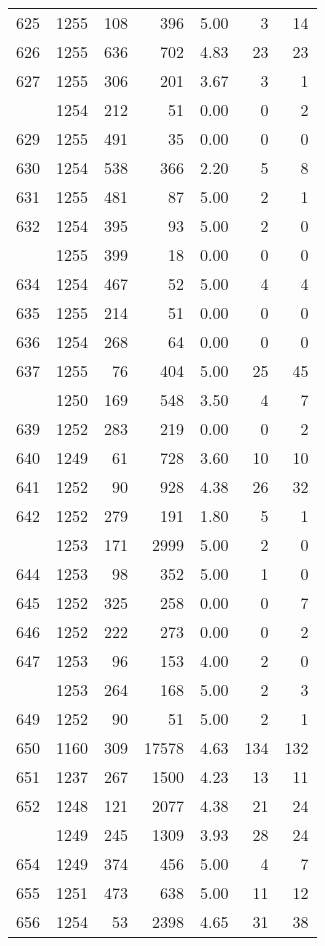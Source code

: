\documentclass[
]{article}
\begin{document}
\begin{table}
\begin{tabular}[t]{lrrrrrr}
625 & 1255 & 108 & 396 & 5.00 & 3 & 14\\
626 & 1255 & 636 & 702 & 4.83 & 23 & 23\\
627 & 1255 & 306 & 201 & 3.67 & 3 & 1\\
\addlinespace
628 & 1254 & 212 & 51 & 0.00 & 0 & 2\\
629 & 1255 & 491 & 35 & 0.00 & 0 & 0\\
630 & 1254 & 538 & 366 & 2.20 & 5 & 8\\
631 & 1255 & 481 & 87 & 5.00 & 2 & 1\\
632 & 1254 & 395 & 93 & 5.00 & 2 & 0\\
\addlinespace
633 & 1255 & 399 & 18 & 0.00 & 0 & 0\\
634 & 1254 & 467 & 52 & 5.00 & 4 & 4\\
635 & 1255 & 214 & 51 & 0.00 & 0 & 0\\
636 & 1254 & 268 & 64 & 0.00 & 0 & 0\\
637 & 1255 & 76 & 404 & 5.00 & 25 & 45\\
\addlinespace
638 & 1250 & 169 & 548 & 3.50 & 4 & 7\\
639 & 1252 & 283 & 219 & 0.00 & 0 & 2\\
640 & 1249 & 61 & 728 & 3.60 & 10 & 10\\
641 & 1252 & 90 & 928 & 4.38 & 26 & 32\\
642 & 1252 & 279 & 191 & 1.80 & 5 & 1\\
\addlinespace
643 & 1253 & 171 & 2999 & 5.00 & 2 & 0\\
644 & 1253 & 98 & 352 & 5.00 & 1 & 0\\
645 & 1252 & 325 & 258 & 0.00 & 0 & 7\\
646 & 1252 & 222 & 273 & 0.00 & 0 & 2\\
647 & 1253 & 96 & 153 & 4.00 & 2 & 0\\
\addlinespace
648 & 1253 & 264 & 168 & 5.00 & 2 & 3\\
649 & 1252 & 90 & 51 & 5.00 & 2 & 1\\
650 & 1160 & 309 & 17578 & 4.63 & 134 & 132\\
651 & 1237 & 267 & 1500 & 4.23 & 13 & 11\\
652 & 1248 & 121 & 2077 & 4.38 & 21 & 24\\
\addlinespace
653 & 1249 & 245 & 1309 & 3.93 & 28 & 24\\
654 & 1249 & 374 & 456 & 5.00 & 4 & 7\\
655 & 1251 & 473 & 638 & 5.00 & 11 & 12\\
656 & 1254 & 53 & 2398 & 4.65 & 31 & 38\\

\end{tabular}
\end{table}
\end{document}
